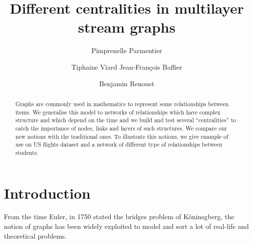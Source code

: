 \documentclass{svproc}
\begin{document}
\mainmatter              %
%
\title{Different centralities in multilayer stream graphs}
%
%
\author{Pimprenelle Parmentier \and Tiphaine Viard
Jean-François Baffier \and Benjamin Renoust}
%
%
%

\maketitle              %

\begin{abstract}
Graphs are commonly used in mathematics to represent some relationships between items. We generalise this model to networks of relationships which have complex structure and which depend on the time and we build and test several ``centralities'' to catch the importance of nodes, links and layers of such structures. We compare our new notions with the traditional ones. To illustrate this notions, we give example of use on US flights dataset and a network of different type of relationships between students.
\end{abstract}
%

\section{Introduction}
%
From the time Euler, in 1750 stated the bridges problem of Köninsgberg, the notion of graphs has been widely exploited to model and sort a lot of real-life and theoretical problems.
\end{document}
